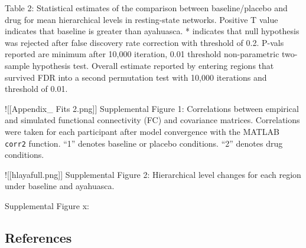 Table 2: Statistical estimates of the comparison between
baseline/placebo and drug for mean hierarchical levels in resting-state
networks. Positive T value indicates that baseline is greater than
ayahuasca. * indicates that null hypothesis was rejected after false
discovery rate correction with threshold of 0.2. P-vals reported are
minimum after 10,000 iteration, 0.01 threshold non-parametric two-sample
hypothesis test. Overall estimate reported by entering regions that
survived FDR into a second permutation test with 10,000 iterations and
threshold of 0.01.

!{[}{[}Appendix\_ Fits 2.png{]}{]} Supplemental Figure 1: Correlations
between empirical and simulated functional connectivity (FC) and
covariance matrices. Correlations were taken for each participant after
model convergence with the MATLAB \texttt{corr2} function. ``1'' denotes
baseline or placebo conditions. ``2'' denotes drug conditions.

!{[}{[}hlayafull.png{]}{]} Supplemental Figure 2: Hierarchical level
changes for each region under baseline and ayahuasca.

Supplemental Figure x:

\subsection*{References}\label{references}

